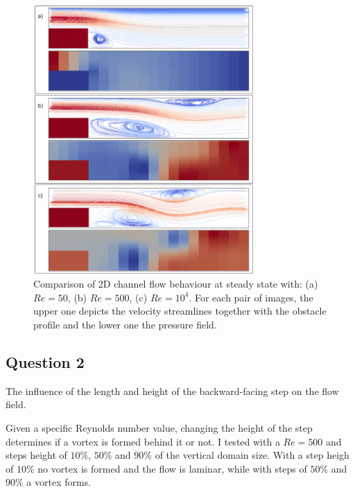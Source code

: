 \documentclass[11pt,a4paper,DIV12,pdftex]{scrartcl}
\begin{document}
\begin{enumerate}
	\begin{figure}[h!]
		\begin{center}
			\includegraphics[width=0.75\textwidth]{Figures/Channel2D_Step_ReComparison.png}
			\caption{Comparison of 2D channel flow behaviour at steady state with: (a) $Re=50$, (b) $Re=500$, (c) $Re=10^4$. For each pair of images, the upper one depicts the velocity streamlines together with the obstacle profile and the lower one the pressure field.}
			\label{fig:Channel2D_Step_ReComparison}
		\end{center}
	\end{figure}
\end{enumerate}

\subsection{Question 2}
\begin{shaded}
	The influence of the length and height of the backward-facing step on the flow field.
\end{shaded}

Given a specific Reynolds number value, changing the height of the step determines if a vortex is formed behind it or not. I tested with a $Re=500$ and steps height of $10\%$, $50\%$ and $90\%$ of the vertical domain size. With a step heigh of $10\%$ no vortex is formed and the flow is laminar, while with steps of $50\%$ and $90\%$ a vortex forms.
\end{document}
